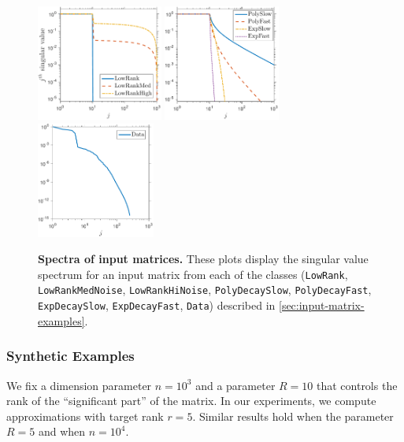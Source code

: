 \documentclass[final]{siamart1116}
\numberwithin{equation}{section}
\numberwithin{theorem}{section}
\numberwithin{figure}{section}
\begin{document}
\begin{figure}[tp!]
\begin{center}
\includegraphics[height=1.5in]{figures/spectrum-noise.pdf} \hspace{0.5pc}
\includegraphics[height=1.5in]{figures/spectrum-decay} \hspace{0.5pc}
\includegraphics[height=1.5in]{figures/spectrum-data.pdf}
\caption{\textbf{Spectra of input matrices.}
These plots display the singular value spectrum for an input
matrix from each of the classes (\texttt{LowRank}, \texttt{LowRankMedNoise}, \texttt{LowRankHiNoise},
\texttt{PolyDecaySlow}, \texttt{PolyDecayFast}, \texttt{ExpDecaySlow}, \texttt{ExpDecayFast}, \texttt{Data})
described in \cref{sec:input-matrix-examples}.}
\label{fig:singVal}
\end{center}
\end{figure}



\subsubsection{Synthetic Examples}

We fix a dimension parameter $n = 10^3$ and
a parameter $R = 10$ that controls the rank of
the ``significant part'' of the matrix.
In our experiments, we compute
approximations with target rank $r = 5$.
Similar results hold when the parameter $R = 5$
and when $n = 10^4$.
\end{document}
